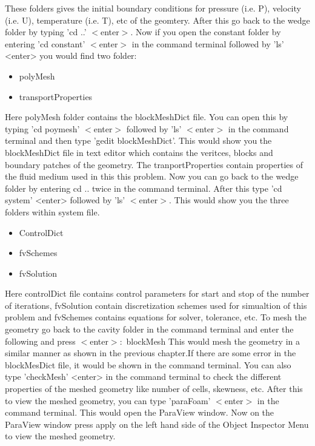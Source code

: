 \flushleft These folders gives the initial boundary conditions for pressure (i.e. P), velocity (i.e. U), temperature (i.e. T), etc of the geomtery. After this go back to the wedge folder by typing 'cd ..' $<$enter$>$.
\flushleft Now if you open the constant folder by entering 'cd constant' $<$enter$>$ in the command terminal followed by 'ls' <enter> you would find two folder$:$

\begin{itemize}
  \item polyMesh
  \item transportProperties
\end{itemize}

\flushleft Here polyMesh folder contains the blockMeshDict file. You can open this by typing 'cd poymesh' $<$enter$>$ followed by 'ls' $<$enter$>$ in the command terminal and then type 'gedit blockMeshDict'. This would show you the blockMeshDict file in text editor which contains the veritces, blocks and boundary patches of the geometry. The tranportProperties contain properties of the fluid medium used in this this problem. 
\flushleft Now you can go back to the wedge folder by entering cd .. twice in the command terminal. After this type 'cd system' <enter> followed by 'ls' $<$enter$>$. This would show you the three folders within system file.

\begin{itemize}
  \item ControlDict
  \item fvSchemes
  \item fvSolution
\end{itemize}


\flushleft Here controlDict file contains control parameters for start and stop of the number of iterations, fvSolution contain discretization schemes used for simualtion of this problem and fvSchemes contains equations for solver, tolerance, etc.
\flushleft To mesh the geometry go back to the cavity folder in the command terminal and enter the following and press $<$enter$>$$:$
\flushleft blockMesh
\flushleft This would mesh the geometry in a similar manner as shown in the previous chapter.If there are some error in the blockMesDict file, it would be shown in the command terminal. You can also type 'checkMesh' <enter> in the command terminal to check the different properties of the meshed geometry like number of cells, skewness, etc. 
\flushleft After this to view the meshed geometry, you can type 'paraFoam' $<$enter$>$ in the command terminal. This would open the ParaView window. Now on the ParaView window press apply on the left hand side of the Object Inspector Menu to view the meshed geometry. 

